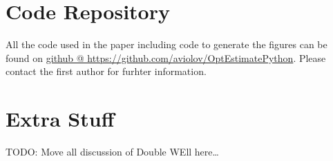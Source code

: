 \section{Code Repository}
All the code used in the paper including code to generate the figures can be
found on
\href{https://github.com/aviolov/OptEstimatePython}{github @
https://github.com/aviolov/OptEstimatePython}. Please contact the first author
for furhter information.



\section{Extra Stuff}
TODO: Move all discussion of Double WEll here\ldots


 
\clearpage